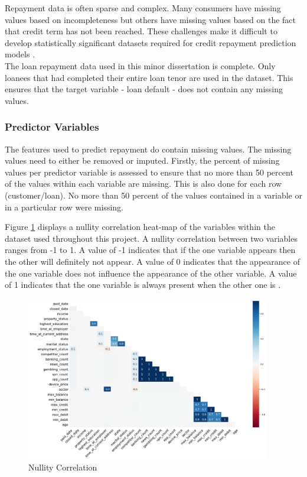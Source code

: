 Repayment data is often sparse and complex. Many consumers have missing values based on incompleteness but others have missing values based on the fact that credit term has not been reached. These challenges make it difficult to develop statistically significant datasets required for credit repayment prediction models \parencite{MissingValuesCR}. \\ 

The loan repayment data used in this minor dissertation is complete. Only loanees that had completed their entire loan tenor are used in the dataset. This ensures that the target variable - loan default - does not contain any missing values.

\subsubsection{Predictor Variables}

The features used to predict repayment do contain missing values. The missing values need to either be removed or imputed. Firstly, the percent of missing values per predictor variable is assessed to ensure that no more than 50 percent of the values within each variable are missing. This is also done for each row (customer/loan). No more than 50 percent of the values contained in a variable or in a particular row were missing. \newpage

Figure \ref{fig:nullity} displays a nullity correlation heat-map of the variables within the dataset used throughout this project. A nullity correlation between two variables ranges from -1 to 1. A value of -1 indicates that if the one variable appears then the other will definitely not appear. A value of 0 indicates that the  appearance of the one variable does not influence the appearance of the other variable. A value of 1 indicates that the one variable is always present when the other one is \parencite{nullity}.  \\

\vspace{10pt}

\begin{figure}[!htb]
\centering
\includegraphics[width=0.95\textwidth]{images/nutility_correlation.png}
\caption{Nullity Correlation}
\label{fig:nullity}
\end{figure}


